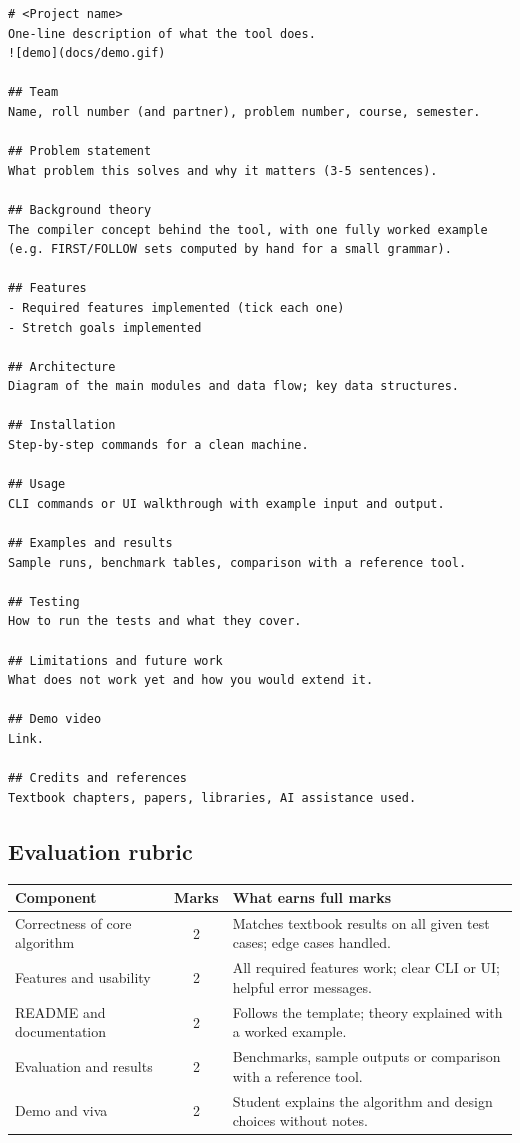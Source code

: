 \documentclass[11pt,a4paper]{article}
\begin{document}
\begin{Verbatim}[fontsize=\small,frame=single,framerule=0.4pt]
# <Project name>
One-line description of what the tool does.
![demo](docs/demo.gif)

## Team
Name, roll number (and partner), problem number, course, semester.

## Problem statement
What problem this solves and why it matters (3-5 sentences).

## Background theory
The compiler concept behind the tool, with one fully worked example
(e.g. FIRST/FOLLOW sets computed by hand for a small grammar).

## Features
- Required features implemented (tick each one)
- Stretch goals implemented

## Architecture
Diagram of the main modules and data flow; key data structures.

## Installation
Step-by-step commands for a clean machine.

## Usage
CLI commands or UI walkthrough with example input and output.

## Examples and results
Sample runs, benchmark tables, comparison with a reference tool.

## Testing
How to run the tests and what they cover.

## Limitations and future work
What does not work yet and how you would extend it.

## Demo video
Link.

## Credits and references
Textbook chapters, papers, libraries, AI assistance used.
\end{Verbatim}

\subsection{Evaluation rubric}

\begin{longtable}{@{}p{5cm} c p{8.6cm}@{}}
\toprule
\textbf{Component} & \textbf{Marks} & \textbf{What earns full marks} \\
\midrule
\endhead
Correctness of core algorithm & 2 & Matches textbook results on all given test cases; edge cases handled. \\
Features and usability & 2 & All required features work; clear CLI or UI; helpful error messages. \\
README and documentation & 2 & Follows the template; theory explained with a worked example. \\
Evaluation and results & 2 & Benchmarks, sample outputs or comparison with a reference tool. \\
Demo and viva & 2 & Student explains the algorithm and design choices without notes. \\
\bottomrule
\end{longtable}
\end{document}
